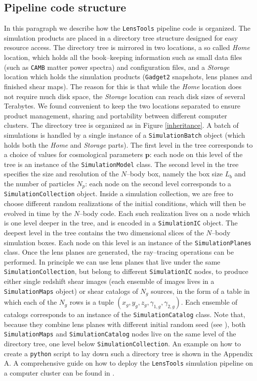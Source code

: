 \documentclass[reprint,aps,prd,superscriptaddress,showkeys,showpacs]{revtex4-1}
\newcommand{\bb}[1]{\mathbf{#1}}
\newcommand{\ttt}[1]{\texttt{#1}}
\newcommand{\LT}{\texttt{LensTools} }
\begin{document}
\subsection{Pipeline code structure}
%
In this paragraph we describe how the \LT pipeline code is organized. The simulation products are placed in a directory tree structure designed for easy resource access. The directory tree is mirrored in two locations, a so called \textit{Home} location, which holds all the book--keeping information such as small data files (such as \ttt{CAMB} matter power spectra) and configuration files, and a \textit{Storage} location which holds the simulation products (\ttt{Gadget2} snapshots, lens planes and finished shear maps). The reason for this is that while the \textit{Home} location does not require much disk space, the \textit{Storage} location can reach disk sizes of several Terabytes. We found convenient to keep the two locations separated to ensure product management, sharing and portability between different computer clusters. The directory tree is organized as in Figure \ref{inheritance}. 
A batch of simulations is handled by a single instance of a \ttt{SimulationBatch} object (which holds both the \textit{Home} and \textit{Storage} parts). The first level in the tree corresponds to a choice of values for cosmological parameters $\bb{p}$: each node on this level of the tree is an instance of the \ttt{SimulationModel} class. The second level in the tree specifies the size and resolution of the $N$--body box, namely the box size $L_b$ and the number of particles $N_p$: each node on the second level corresponds to a \ttt{SimulationCollection} object. Inside a simulation collection, we are free to choose different random realizations of the initial conditions, which will then be evolved in time by the $N$--body code. Each such realization lives on a node which is one level deeper in the tree, and is encoded in a \ttt{SimulationIC} object. The deepest level in the tree contains the two dimensional slices of the $N$--body simulation boxes. Each node on this level is an instance of the \ttt{SimulationPlanes} class. Once the lens planes are generated, the ray--tracing operations can be performed. In principle we can use lens planes that live under the same \ttt{SimulationCollection}, but belong to different \ttt{SimulationIC} nodes, to produce either single redshift shear images (each ensemble of images lives in a \ttt{SimulationMaps} object) or shear catalogs of $N_g$ sources, in the form of a table in which each of the $N_g$ rows is a tuple $(x_g,y_g,z_g,\gamma_{1,g},\gamma_{2,g})$. Each ensemble of catalogs corresponds to an instance of the \ttt{SimulationCatalog} class. Note that, because they combine lens planes with different initial random seed (see \citep{Petri16}), both \ttt{SimulationMaps} and \ttt{SimulationCatalog} nodes live on the same level of the directory tree, one level below \ttt{SimulationCollection}. An example on how to create a \ttt{python} script to lay down such a directory tree is shown in the Appendix A. A comprehensive guide on how to deploy the \LT simulation pipeline on a computer cluster can be found in \citep{lenstoolsdocs}.      
\end{document}
